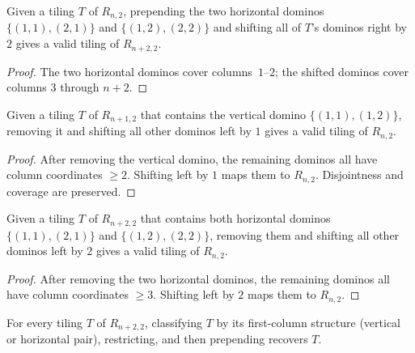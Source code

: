 \begin{lemma}
\label{lem.details.domino.prependHorizontalPair}
\leanhelper
\leanok
Given a tiling $T$ of $R_{n,2}$, prepending the two horizontal
dominos $\{(1,1),(2,1)\}$ and $\{(1,2),(2,2)\}$ and shifting all of $T$'s
dominos right by $2$ gives a valid tiling of $R_{n+2,2}$.
\end{lemma}

\begin{proof}
\leanok
The two horizontal dominos cover columns~$1$--$2$; the shifted dominos
cover columns $3$ through $n+2$.
\end{proof}

\begin{lemma}
\label{lem.details.domino.restrictAfterVertical}
\leanhelper
\leanok
Given a tiling $T$ of $R_{n+1,2}$ that contains the vertical domino
$\{(1,1),(1,2)\}$, removing it and shifting all other dominos left by $1$
gives a valid tiling of $R_{n,2}$.
\end{lemma}

\begin{proof}
\leanok
After removing the vertical domino, the remaining dominos all have column
coordinates $\ge 2$. Shifting left by $1$ maps them to $R_{n,2}$.
Disjointness and coverage are preserved.
\end{proof}

\begin{lemma}
\label{lem.details.domino.restrictAfterHorizontalPair}
\leanhelper
\leanok
Given a tiling $T$ of $R_{n+2,2}$ that contains both horizontal
dominos $\{(1,1),(2,1)\}$ and $\{(1,2),(2,2)\}$, removing them and shifting
all other dominos left by $2$ gives a valid tiling of $R_{n,2}$.
\end{lemma}

\begin{proof}
\leanok
After removing the two horizontal dominos, the remaining dominos all have
column coordinates $\ge 3$. Shifting left by $2$ maps them to $R_{n,2}$.
\end{proof}

\begin{lemma}
\label{lem.details.domino.tiling-2-roundtrip}
\leanhelper
\leanok
For every tiling $T$ of $R_{n+2,2}$, classifying $T$ by
its first-column structure (vertical or horizontal pair), restricting,
and then prepending recovers $T$.
\end{lemma}

